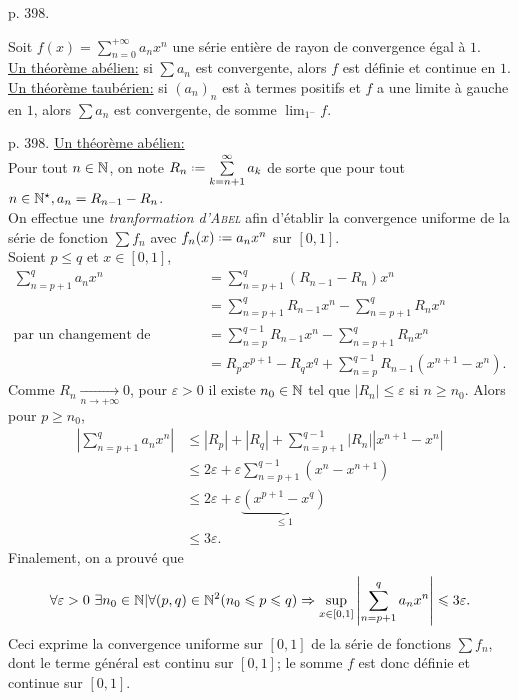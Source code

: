 \cite{exos_oraux} p. 398.

\begin{theo}

Soit $f(x) = \sum\limits_{n=0}^{+\infty} a_n x^n$ une série entière de rayon de convergence égal à $1$. \\
\underline{Un théorème abélien:} si $\sum a_n$ est convergente, alors $f$ est définie et continue en $1$. \\
\underline{Un théorème taubérien:} si $(a_n)_n$ est à termes positifs et $f$ a une limite à gauche en $1$, alors $\sum a_n$ est convergente, de somme $\displaystyle \lim_{1^-}f$.
\end{theo}

\begin{preuve} \cite{exos_oraux} p. 398.
    \underline{Un théorème abélien:} \\
    Pour tout $n \in \mathbb{N}$, on note $R_n \defeq \sum\limits_{k = n+1}^{\infty} a_k$ de sorte que pour tout $n \in \mathbb{N}^\star, a_n = R_{n-1} - R_n$. \\
    On effectue une \emph{tranformation d'\textsc{Abel}} afin d'établir la convergence uniforme de la série de fonction $\sum f_n$ avec $f_n(x) \defeq a_n x^n$ sur $[0, 1]$. \\
    Soient $p \leqslant q$ et $x \in [0,1]$,
    \begin{align*}
        \sum_{n=p+1}^q a_n x^n &= \sum_{n=p+1}^q (R_{n-1} -R_n) x^n \\
        &= \sum_{n=p+1}^q R_{n-1} x^n - \sum_{n=p+1}^q R_n x^n \\
    \text{par un changement de variable} &= \sum_{n=p}^{q-1} R_{n-1} x^n - \sum_{n=p+1}^q R_n x^n \\
    &= R_px^{p+1} - R_q x^q + \sum_{n=p}^{q-1} R_{n-1} (x^{n+1}-x^n).
    \end{align*}
    Comme $R_n \xrightarrow[n \to +\infty]{}0$, pour $\varepsilon > 0$ il existe $n_0 \in \mathbb{N}$ tel que $|R_n| \leqslant \varepsilon$ si $n \geqslant n_0$. Alors pour $p \geqslant n_0$, 
    \begin{align*}
        \left| \sum_{n=p+1}^q a_n x^n \right| &\leqslant |R_p| + |R_q| + \sum_{n=p+1}^{q-1} |R_n||x^{n+1}-x^n| \\
        &\leqslant 2 \varepsilon + \varepsilon \sum_{n=p+1}^{q-1} (x^n-x^{n+1}) \\
        &\leqslant 2 \varepsilon + \varepsilon \underbrace{(x^{p+1}-x^q)}_{\leqslant 1} \\
        &\leqslant 3 \varepsilon.
    \end{align*}
    Finalement, on a prouvé que
    $$\forall \varepsilon > 0\ \exists n_0 \in \mathbb{N} | \forall(p,q) \in \mathbb{N}^2 (n_0 \leqslant p \leqslant q) \Rightarrow \sup_{x \in [0, 1]} \left| \sum_{n=p+1}^q a_n x^n \right| \leqslant 3 \varepsilon.$$
    Ceci exprime la convergence uniforme sur $[0, 1]$ de la série de fonctions $\sum f_n$, dont le terme général est continu sur $[0,1]$; le somme $f$ est donc définie et continue sur $[0, 1]$.
\end{preuve}